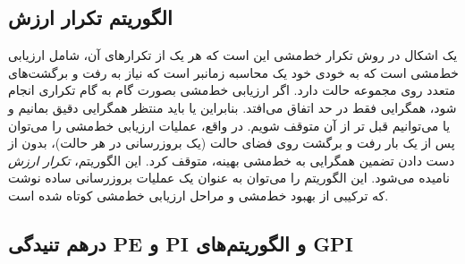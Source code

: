 \subsection{الگوریتم تکرار ارزش}
یک اشکال در روش تکرار خط‌مشی این است که هر یک از تکرارهای آن، شامل ارزیابی خط‌مشی است که
به خودی خود یک محاسبه زمان\nf بر است که نیاز به رفت و برگشت‌های متعدد روی مجموعه حالت دارد. اگر
ارزیابی خط‌مشی بصورت گام به گام تکراری انجام شود، همگرایی فقط در حد اتفاق می‌افتد. بنابراین یا باید منتظر همگرایی دقیق بمانیم و یا می‌توانیم قبل تر از آن متوقف شویم. 
در واقع، عملیات ارزیابی خط‌مشی را می‌توان پس از یک بار رفت و برگشت روی فضای حالت (یک بروزرسانی در هر حالت)،  بدون از دست دادن تضمین همگرایی به خط‌مشی بهینه، متوقف کرد. 
این الگوریتم،
\textit{تکرار ارزش}
 نامیده می‌شود. این الگوریتم
را می‌توان به عنوان یک عملیات بروزرسانی ساده نوشت که ترکیبی از بهبود خط‌مشی و
مراحل ارزیابی خط‌مشی کوتاه شده است.


%

\subsection{درهم تنیدگی PE و PI و الگوریتم‌های GPI}


